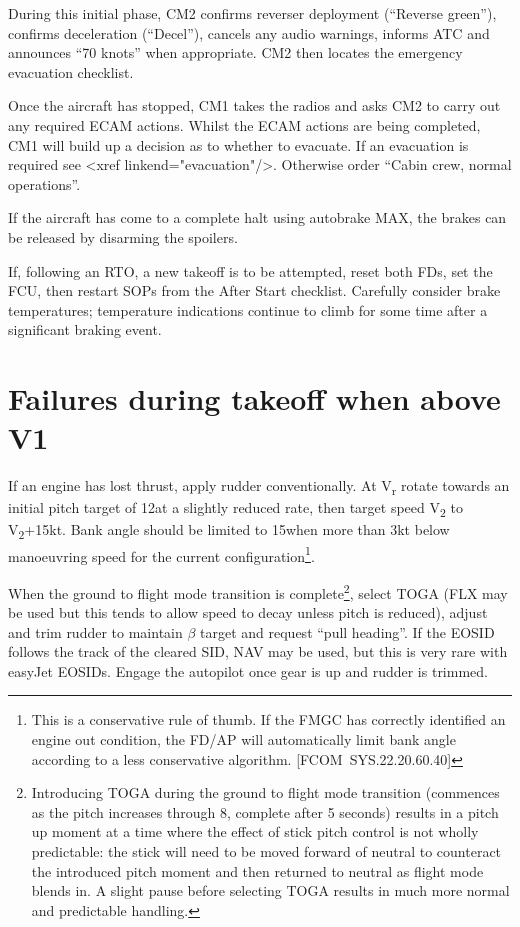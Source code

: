 \documentclass[a5paper,11pt,twoside]{book}
\newcommand{\multicite}[1]{
  \nopagebreak
  \noindent{\footnotesize\color{blue}{[ #1 ]}}
}
\newcommand{\V}[1]{V\textsubscript{#1}}
\begin{document}
During this initial phase, CM2 confirms reverser deployment (``Reverse green''),
confirms deceleration (``Decel''), cancels any audio warnings, informs ATC and
announces ``70 knots'' when appropriate. CM2 then locates the emergency
evacuation checklist.

Once the aircraft has stopped, CM1 takes the radios and asks CM2 to carry out
any required ECAM actions. Whilst the ECAM actions are being completed, CM1 will
build up a decision as to whether to evacuate. If an evacuation is required see
<xref linkend="evacuation"/>. Otherwise order ``Cabin crew, normal operations''.

If the aircraft has come to a complete halt using autobrake MAX, the brakes can
be released by disarming the spoilers.

If, following an RTO, a new takeoff is to be attempted, reset both FDs, set the
FCU, then restart SOPs from the After Start checklist. Carefully consider brake
temperatures; temperature indications continue to climb for some time after a
significant braking event.

\multicite{EOMB~3.10, FCTM~PRO.AEP.MISC}


\section{Failures during takeoff when above V1}

If an engine has lost thrust, apply rudder conventionally. At V\textsubscript{r}
rotate towards an initial pitch target of 12\textonehalf\textdegree{ }at a
slightly reduced rate, then target speed \V{2} to \V{2}+15kt. Bank angle should
be limited to 15\textdegree{ }when more than 3kt below manoeuvring speed for
the current configuration\footnote{This is a conservative rule of thumb. If the
FMGC has correctly identified an engine out condition, the FD/AP will
automatically limit bank angle according to a less conservative
algorithm. [FCOM~SYS.22.20.60.40]}.

When the ground to flight mode transition is complete\footnote{Introducing TOGA
during the ground to flight mode transition (commences as the pitch increases
through 8\textdegree{ }, complete after 5 seconds) results in a pitch up moment at a time
where the effect of stick pitch control is not wholly predictable: the stick
will need to be moved forward of neutral to counteract the introduced pitch
moment and then returned to neutral as flight mode blends in. A slight pause
before selecting TOGA results in much more normal and predictable handling.},
select TOGA (FLX may be used but this tends to allow speed to decay unless pitch
is reduced), adjust and trim rudder to maintain $\beta$ target and request ``pull
heading''. If the EOSID follows the track of the cleared SID, NAV may be used,
but this is very rare with easyJet EOSIDs.  Engage the autopilot once gear is up
and rudder is trimmed.
\end{document}
